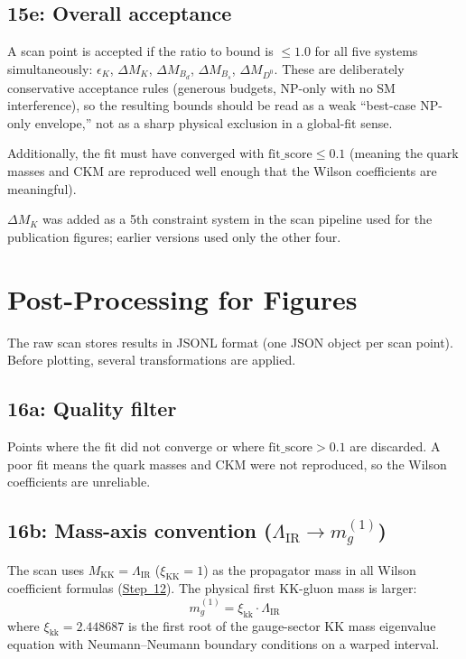 \documentclass[11pt]{article}
\newcommand{\Mkk}{M_{\mathrm{KK}}}
\newcommand{\LamIR}{\Lambda_{\mathrm{IR}}}
\begin{document}
\subsection{15e: Overall acceptance}
\label{sec:step15e}

A scan point is accepted if the ratio to bound is $\le 1.0$ for all five
systems simultaneously: $\epsilon_K$, $\Delta M_K$, $\Delta M_{B_d}$,
$\Delta M_{B_s}$, $\Delta M_{D^0}$. These are deliberately conservative
acceptance rules (generous budgets, NP-only with no SM interference), so the
resulting bounds should be read as a weak ``best-case NP-only envelope,'' not
as a sharp physical exclusion in a global-fit sense.

Additionally, the fit must have converged with $\text{fit\_score} \le 0.1$
(meaning the quark masses and CKM are reproduced well enough that the Wilson
coefficients are meaningful).

$\Delta M_K$ was added as a 5th constraint system in the scan pipeline used for
the publication figures; earlier versions used only the other four.

\section{Post-Processing for Figures}
\label{sec:step16}

The raw scan stores results in JSONL format (one JSON object per scan point).
Before plotting, several transformations are applied.

\subsection{16a: Quality filter}
\label{sec:step16a}

Points where the fit did not converge or where $\text{fit\_score} > 0.1$ are
discarded.  A poor fit means the quark masses and CKM were not reproduced, so
the Wilson coefficients are unreliable.

\subsection{16b: Mass-axis convention ($\LamIR \to m_g^{(1)}$)}
\label{sec:step16b}

The scan uses $\Mkk = \LamIR$ ($\xi_{\mathrm{KK}} = 1$) as the propagator mass
in all Wilson coefficient formulas (\hyperref[sec:step12]{Step~12}).  The
physical first KK-gluon mass is larger:
\begin{equation}
  m_g^{(1)} = \xi_{\mathrm{kk}} \cdot \LamIR
\end{equation}
where $\xi_{\mathrm{kk}} = 2.448687$ is the first root of the gauge-sector KK
mass eigenvalue equation with Neumann--Neumann boundary conditions on a warped
interval.
\end{document}
